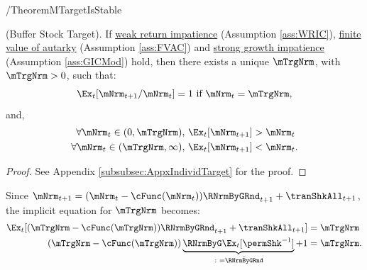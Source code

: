\documentclass[\econtexRoot/BufferStockTheory]{subfiles}
\begin{document}
\begin{verbatimwrite}{\EqDir/TheoremMTargetIsStable}
  \begin{theorem}\label{thm:target} (Buffer Stock Target).
If \hyperlink{WRIC}{weak return impatience} (Assumption \ref{ass:WRIC}), \hyperlink{FVAC}{finite value of autarky} (Assumption \ref{ass:FVAC}) and \hyperlink{GICMod}{strong growth impatience} (Assumption \ref{ass:GICMod}) hold, then there exists a unique $\mTrgNrm$, with $\mTrgNrm>0$, such that:
    \begin{equation}
      \Ex_t [{\mNrm}_{t+1}/\mNrm_t] = 1 \mbox{~if~} \mNrm_t = \mTrgNrm, 
      \label{eq:mTarget} %
    \end{equation}
    and, 
    \begin{equation}
      \label{eq:stability} %
      \begin{aligned}
        \forall {\mNrm}_t\in(0,\mTrgNrm),      \,\,& \Ex_t [{\mNrm}_{t+1}] > {\mNrm}_t  \\
        \forall {\mNrm}_t\in(\mTrgNrm,\infty), \,\,& \Ex_t [{\mNrm}_{t+1}] < {\mNrm}_t.
      \end{aligned}
    \end{equation}
  \end{theorem}
\end{verbatimwrite} \unskip


\begin{proof}\let\qed\relax
See Appendix \ref{subsubsec:AppxIndividTarget} for the proof.

\end{proof}



\hypertarget{mTargImplicit}{}
Since $\mNrm_{t+1}= (\mNrm_{t}-\cFunc(\mNrm_{t}))\RNrmByGRnd_{t+1}  +\tranShkAll_{t+1}$, the implicit equation for $\mTrgNrm$ becomes:
%
\begin{equation} \label{eq:mTargImplicit}
  \begin{aligned}
    \Ex_{t} [(\mTrgNrm-\cFunc(\mTrgNrm))\RNrmByGRnd_{t+1}+\tranShkAll_{t+1}] & = \mTrgNrm     \\   (\mTrgNrm-\cFunc(\mTrgNrm))\underbrace{\RNrmByG\Ex_{t}[\permShk^{-1}]}_{\colon = \bar{\RNrmByGRnd}}+1 & = \mTrgNrm .
  \end{aligned}
\end{equation}
\end{document}
